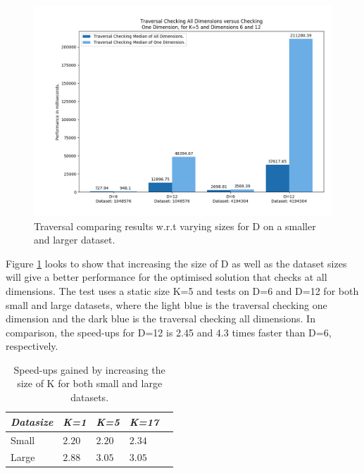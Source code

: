 \begin{figure}[H]
\centering
\includegraphics[width=1\textwidth]{pics/plot-figs/new-trav-k5-d6d12.png}
\caption{Traversal comparing results w.r.t varying sizes for D on a smaller and larger dataset.}
\label{fig:trav1}
\end{figure}

Figure \ref{fig:trav1} looks to show that increasing the size of D as well as the dataset sizes will give a better performance for the optimised solution that checks at all dimensions. The test uses a static size K=5 and tests on D=6 and D=12 for both small and large datasets, where the light blue is the traversal checking one dimension and the dark blue is the traversal checking all dimensions. In comparison, the speed-ups for D=12 is 2.45 and 4.3 times faster than D=6, respectively. 



\begin{table}[H]
\centering
\begin{tabular}{@{} *5l @{}}    \toprule
\emph{Datasize} & \emph{K=1} & \emph{K=5} & \emph{K=17} &  \\\midrule
Small     & $2.20$  & $2.20$  & $2.34$  &   \\ 
Large     & $2.88$ & $3.05$ & $3.05$ & \\ \bottomrule
 \hline
\end{tabular}
\caption{Speed-ups gained by increasing the size of K for both small and large datasets.}
\label{tab:travk}
\end{table}

